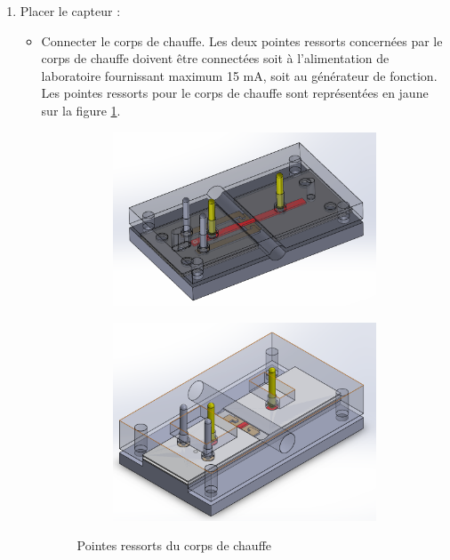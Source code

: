 \begin{enumerate}
    \item Placer le capteur :
          \begin{itemize}
              \item Connecter le corps de chauffe. Les deux pointes ressorts concernées par le corps de chauffe doivent
                    être connectées soit à l'alimentation de laboratoire fournissant maximum 15 mA, soit au générateur de fonction. 
                    Les pointes ressorts pour le corps de chauffe sont représentées en jaune sur la figure \ref{fig:pointes_ressorts_chauffe}.
                    \begin{figure}[H]
                        \centering
                        \begin{subfigure}[b]{0.45\textwidth}
                            \includegraphics[scale = 0.3]{assets/figures/pointes_ressorts_chauffe.png}
                        \end{subfigure}
                        \begin{subfigure}{0.45\textwidth}
                            \includegraphics[scale = 0.3]{assets/figures/pointes_ressorts_chauffe_design5.png}
                        \end{subfigure}
                        \caption{Pointes ressorts du corps de chauffe}
                        \label{fig:pointes_ressorts_chauffe}
                    \end{figure}
          \end{itemize}
          

\end{enumerate}
